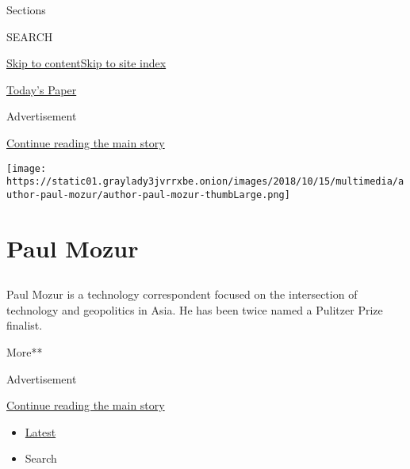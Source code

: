 Sections

SEARCH

\protect\hyperlink{site-content}{Skip to
content}\protect\hyperlink{site-index}{Skip to site index}

\href{https://myaccount.nytimes3xbfgragh.onion/auth/login?response_type=cookie\&client_id=vi}{}

\href{https://www.nytimes3xbfgragh.onion/section/todayspaper}{Today's
Paper}

Advertisement

\protect\hyperlink{after-top}{Continue reading the main story}

\texttt{[image: https://static01.graylady3jvrrxbe.onion/images/2018/10/15/multimedia/author-paul-mozur/author-paul-mozur-thumbLarge.png]}

\hypertarget{paul-mozur}{%
\section{Paul Mozur}\label{paul-mozur}}

\subsection{}

Paul Mozur is a technology correspondent focused on the intersection of
technology and geopolitics in Asia. He has been twice named a Pulitzer
Prize finalist.

More**

Advertisement

\protect\hyperlink{after-mid1}{Continue reading the main story}

\begin{itemize}
\tightlist
\item
  \protect\hyperlink{stream-panel}{Latest}
\item
  Search
\end{itemize}

